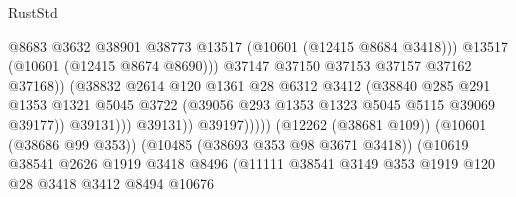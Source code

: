 \begin{lexlean}{RustStd}
\begin{coremodule}
                                                    @8683
                                                    @3632
                                                    @38901
                                                    @38773
                                                    @13517
                                                    (@10601 (@12415 @8684 @3418)))
                                                  @13517
                                                  (@10601 (@12415 @8674 @8690)))
                                                @37147
                                                @37150
                                                @37153
                                                @37157
                                                @37162
                                                @37168))
                                            (@38832
                                              @2614
                                              @120
                                              @1361
                                              @28
                                              @6312
                                              @3412
                                              (@38840
                                                @285
                                                @291
                                                @1353
                                                @1321
                                                @5045
                                                @3722
                                                (@39056 @293 @1353 @1323 @5045 @5115 @39069 @39177))
                                              @39131)))
                                        @39131))
                                    @39197)))))
                          (@12262 (@38681 @109))
                          (@10601 (@38686 @99 @353))
                          (@10485 (@38693 @353 @98 @3671 @3418))
                          (@10619
                            @38541
                            @2626
                            @1919
                            @3418
                            @8496
                            (@11111
                              @38541
                              @3149
                              @353
                              @1919
                              @120
                              @28
                              @3418
                              @3412
                              @8494
                              @10676

\end{coremodule}
\end{lexlean}
